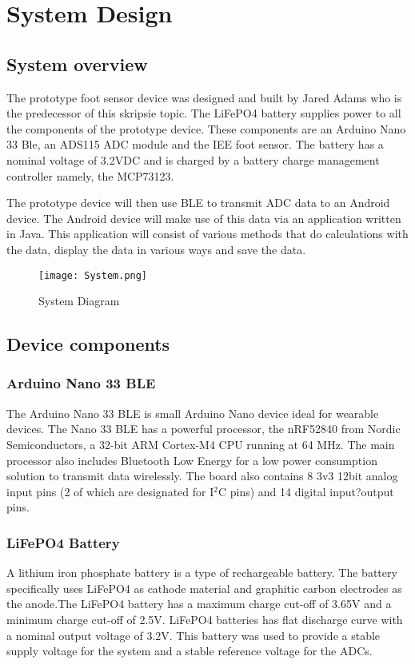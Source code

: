 \graphicspath{{systemdesign/fig/}}
\chapter{System Design}
\label{chap:systemdesign}

\section{System overview}

The prototype foot sensor device was designed and built by Jared Adams who is the predecessor of this skripsie topic.
The LiFePO4 battery supplies power to all the components of the prototype device. These components are an Arduino Nano 33 Ble, an ADS115 ADC module and the IEE foot sensor. The battery has a nominal voltage of 3.2VDC and is charged by a battery charge management controller namely, the MCP73123.

The prototype device will then use BLE to transmit ADC data to an Android device. The Android device will make use of this data via an application written in Java. This application will consist of various methods that do calculations with the data, display the data in various ways and save the data.


\begin{figure}[!h]
    \centering
    \texttt{[image: System.png]}
    \caption{System Diagram}
    \label{fig:sysdiagram}
\end{figure}
\section{Device components}

\subsection{Arduino Nano 33 BLE}
The Arduino Nano 33 BLE is small Arduino Nano device ideal for wearable devices. The Nano 33 BLE has a powerful processor, the nRF52840 from Nordic Semiconductors, a 32-bit ARM Cortex-M4 CPU running at 64 MHz. The main processor also includes Bluetooth Low Energy for a low power consumption solution to transmit data wirelessly. The board also contains 8 3v3 12bit analog input pins (2 of which are designated for I$^2$C pins) and 14 digital input?output pins.


\subsection{LiFePO4 Battery}
A lithium iron phosphate battery is a type of rechargeable battery. The battery specifically uses LiFePO4 as cathode material and graphitic carbon electrodes as the anode.The LiFePO4 battery has a maximum charge cut-off of 3.65V and a minimum charge cut-off of 2.5V. LiFePO4 batteries has flat discharge curve with a nominal output voltage of 3.2V. This battery was used to provide a stable supply voltage for the system and a stable reference voltage for the ADCs.

